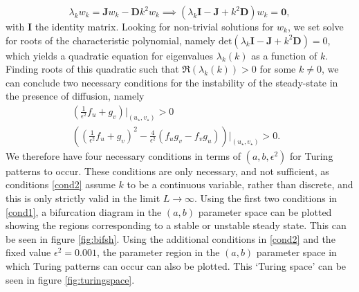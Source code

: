 $$
\lambda_k w_k=\textbf{J}w_k-\textbf{D}k^2w_k \implies (\lambda_k \textbf{I}-\textbf{J}+k^2\textbf{D})w_k=\textbf{0},
$$
with $\textbf{I}$ the identity matrix. Looking for non-trivial solutions for $w_k$, we set solve for roots of the characteristic polynomial, namely $\text{det}(\lambda_k \textbf{I}-\textbf{J}+k^2\textbf{D})=0$, which yields a quadratic equation for eigenvalues $\lambda_k(k)$ as a function of $k$. Finding roots of this quadratic such that $\Re(\lambda_k(k))>0$ for some $k\neq0$, we can conclude two necessary conditions for the instability of the steady-state in the presence of diffusion, namely
\begin{equation}\label{cond2}
    \begin{split}
    \left(\frac{1}{\epsilon^2}f_u+g_v\right)\bigg|_{(u_\star,v_\star)}>0&\\
    \left(\left(\frac{1}{\epsilon^2}f_u+g_v\right)^2-\frac{4}{\epsilon^2}(f_ug_v-f_vg_u)\right)\bigg|_{(u_\star,v_\star)}>0.
\end{split}
\end{equation}
We therefore have four necessary conditions in terms of $(a,b,\epsilon^2)$ for Turing patterns to occur. These conditions are only necessary, and not sufficient, as conditions \eqref{cond2} assume $k$ to be a continuous variable, rather than discrete, and this is only strictly valid in the limit $L\to\infty$. Using the first two conditions in \eqref{cond1}, a bifurcation diagram in the $(a,b)$ parameter space can be plotted showing the regions corresponding to a stable or unstable steady state. This can be seen in figure \ref{fig:bifsh}. Using the additional conditions in \eqref{cond2} and the fixed value $\epsilon^2=0.001$, the parameter region in the $(a,b)$ parameter space in which Turing patterns can occur can also be plotted. This `Turing space' can be seen in figure \ref{fig:turingspace}.

